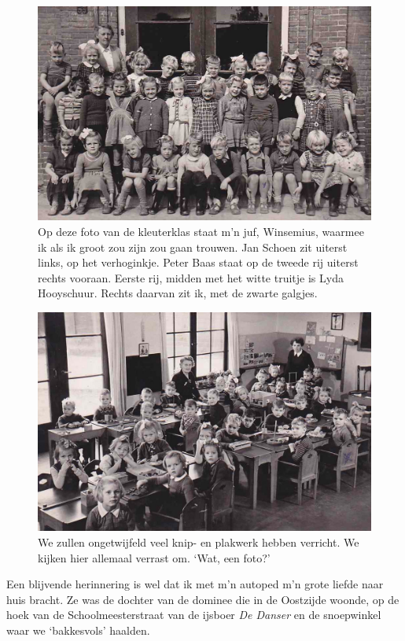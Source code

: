 \documentclass[12pt,twoside, openright]{memoir}
\begin{document}
\begin{figure}
\centering
\includegraphics[width=\textwidth]{img/ch6/klschool53}
\caption*{\footnotesize Op deze foto van de kleuterklas staat m’n juf, Winsemius, waarmee ik als ik groot zou zijn zou gaan trouwen. Jan Schoen zit uiterst links, op het verhoginkje. Peter Baas staat op de tweede rij uiterst rechts vooraan. Eerste rij, midden met het witte truitje is Lyda Hooyschuur. Rechts daarvan zit ik, met de zwarte galgjes.}
\end{figure}

\begin{figure}
\centering
\includegraphics[width=\textwidth]{img/ch6/kleuterschool2}
\caption*{\footnotesize We zullen ongetwijfeld veel knip- en plakwerk hebben verricht. We kijken hier allemaal verrast om. `Wat, een foto?'}
\end{figure}

Een blijvende herinnering is wel dat ik met m’n autoped m’n grote liefde naar huis bracht. Ze was de dochter van de dominee die in de Oostzijde woonde, op de hoek van de Schoolmeesterstraat van de ijsboer \emph{De Danser} en de snoepwinkel waar we `bakkesvols' haalden. 
\end{document}
